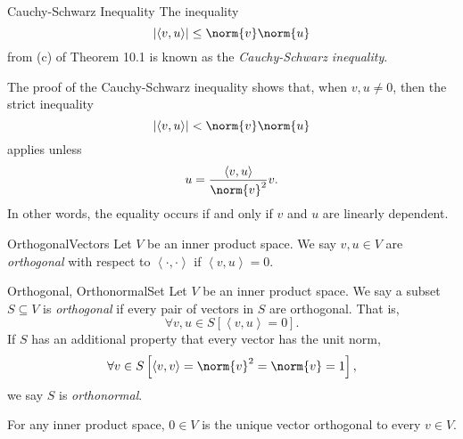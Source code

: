 \documentclass[linearalgebra]{subfiles}
\begin{document}
    \begin{definition}{Cauchy-Schwarz Inequality}{}
        The inequality
        \begin{equation*}
            \left| \left\langle v, u\right\rangle  \right| \leq \norm{v}\norm{u}
        \end{equation*}
        from (c) of Theorem 10.1 is known as the \emph{Cauchy-Schwarz inequality}.
    \end{definition}

    \begin{remark}
        The proof of the Cauchy-Schwarz inequality shows that, when $v,u\neq 0$, then the strict inequality
        \begin{equation*}
            \left| \left\langle v, u\right\rangle  \right| < \norm{v}\norm{u}
        \end{equation*}
        applies unless
        \begin{equation*}
            u = \frac{\left\langle v, u\right\rangle }{\norm{v}^2} v.
        \end{equation*}
        In other words, the equality occurs if and only if $v$ and $u$ are linearly dependent.
    \end{remark}

    \begin{definition}{Orthogonal}{Vectors}
        Let $V$ be an inner product space. We say $v,u\in V$ are \emph{orthogonal} with respect to $\left\langle \cdot, \cdot\right\rangle$ if $\left\langle v, u\right\rangle = 0$.
    \end{definition}

    \begin{definition}{Orthogonal, Orthonormal}{Set}
        Let $V$ be an inner product space. We say a subset $S\subseteq V$ is \emph{orthogonal} if every pair of vectors in $S$ are orthogonal. That is,
        \begin{equation*}
            \forall v,u\in S \left[ \left\langle v, u\right\rangle = 0 \right] .
        \end{equation*}
        If $S$ has an additional property that every vector has the unit norm,
        \begin{equation*}
            \forall v\in S \left[ \left\langle v, v\right\rangle = \norm{v}^2 = \norm{v} = 1 \right] ,
        \end{equation*}
        we say $S$ is \emph{orthonormal}.
    \end{definition}

    \begin{example}
        For any inner product space, $0\in V$ is the unique vector orthogonal to every $v\in V$.
    \end{example}
\end{document}
